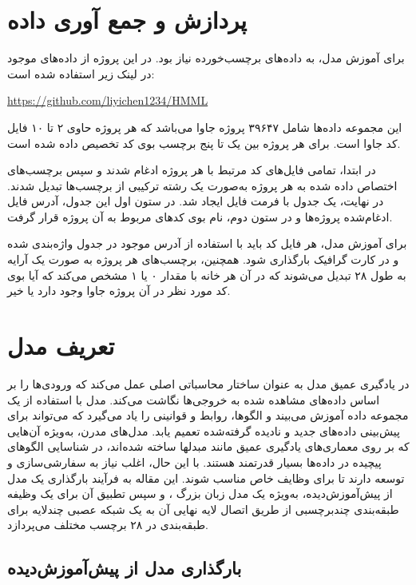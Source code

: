 \section{پردازش و جمع آوری داده}
برای آموزش مدل، به داده‌های برچسب‌خورده نیاز بود. در این پروژه از داده‌های موجود در لینک زیر استفاده شده است:
\begin{latin}
	\url{https://github.com/liyichen1234/HMML}
\end{latin}
این مجموعه داده‌ها شامل ۳۹۶۴۷ پروژه جاوا می‌باشد که هر پروژه حاوی ۲ تا ۱۰ فایل کد جاوا است. برای هر پروژه بین یک تا پنج برچسب بوی کد تخصیص داده شده است.\cite{dataset}

در ابتدا، تمامی فایل‌های کد مرتبط با هر پروژه ادغام شدند و سپس برچسب‌های اختصاص داده شده به هر پروژه به‌صورت یک رشته ترکیبی از برچسب‌ها تبدیل شدند. در نهایت، یک جدول با فرمت فایل  ایجاد شد. در ستون اول این جدول، آدرس فایل ادغام‌شده پروژه‌ها و در ستون دوم، نام بوی کدهای مربوط به آن پروژه قرار گرفت.

برای آموزش مدل، هر فایل کد باید با استفاده از آدرس موجود در جدول واژه‌بندی شده و در کارت گرافیک بارگذاری شود. همچنین، برچسب‌های هر پروژه به صورت یک آرایه به طول ۲۸ تبدیل می‌شوند که در آن هر خانه با مقدار ۰ یا ۱ مشخص می‌کند که آیا بوی کد مورد نظر در آن پروژه جاوا وجود دارد یا خیر.\cite{BOGATINOVSKI2022117215}
\section{تعریف مدل}
در یادگیری عمیق مدل به عنوان ساختار محاسباتی اصلی عمل می‌کند که ورودی‌ها را بر اساس داده‌های مشاهده شده به خروجی‌ها نگاشت می‌کند. مدل با استفاده از یک مجموعه داده آموزش می‌بیند و الگوها، روابط و قوانینی را یاد می‌گیرد که می‌تواند برای پیش‌بینی داده‌های جدید و نادیده گرفته‌شده تعمیم یابد. مدل‌های مدرن، به‌ویژه آن‌هایی که بر روی معماری‌های یادگیری عمیق مانند مبدلها ساخته شده‌اند، در شناسایی الگوهای پیچیده در داده‌ها بسیار قدرتمند هستند. با این حال، اغلب نیاز به سفارشی‌سازی و توسعه دارند تا برای وظایف خاص مناسب شوند. این مقاله به فرآیند بارگذاری یک مدل از پیش‌آموزش‌دیده، به‌ویژه یک مدل زبان بزرگ ، و سپس تطبیق آن برای یک وظیفه طبقه‌بندی چند‌برچسبی از طریق اتصال لایه نهایی آن به یک شبکه عصبی چندلایه برای طبقه‌بندی در ۲۸ برچسب مختلف می‌پردازد.\cite{Zhang2022code}
\subsection{بارگذاری مدل از پیش‌آموزش‌دیده}

